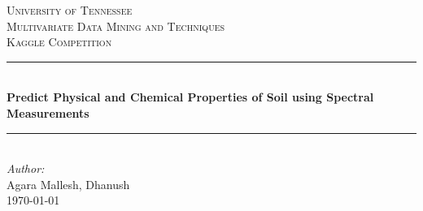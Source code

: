 \documentclass[12pt,letterpaper]{article}
\begin{document}
\begin{titlepage}

\newcommand{\HRule}{\rule{\linewidth}{0.5mm}} %

\center %
 

\textsc{\LARGE University of Tennessee}\\[1.5cm] %
\textsc{\Large Multivariate Data Mining and Techniques}\\[0.5cm] %
\textsc{\large Kaggle Competition}\\[0.5cm] %


\HRule \\[0.4cm]
{ \huge \bfseries Predict Physical and Chemical Properties of Soil using Spectral Measurements}\\[0.4cm] %
\HRule \\[1.5cm]
 

\Large \emph{Author:}\\
Agara Mallesh, Dhanush\\ [3cm] %



{\large \today}\\[2cm] %



\end{titlepage}
\end{document}
